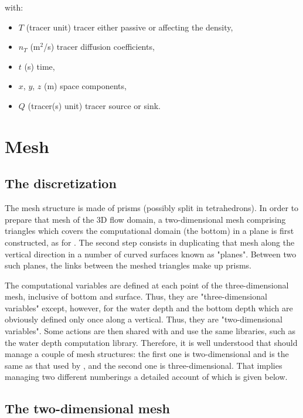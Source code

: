 with:

\begin{itemize}
\item $T$ (tracer unit) tracer either passive or affecting the density,

\item $n_{T}$  (m${}^{2}$/s) tracer diffusion coefficients,

\item $t$  (s) time,

\item $x$, $y$, $z$ (m) space components,

\item $Q$ (tracer(s) unit) tracer source or sink.
\end{itemize}


\section{Mesh}


\subsection{The discretization}

The  mesh structure is made of prisms (possibly split in
tetrahedrons). In order to prepare that mesh of the 3D flow domain, a
two-dimensional mesh comprising triangles which covers the computational domain
(the bottom) in a plane is first constructed, as for . The second
step consists in duplicating that mesh along the vertical direction in a number
of curved surfaces known as "planes". Between two such planes, the links
between the meshed triangles make up prisms.

The computational variables are defined at each point of the three-dimensional
mesh, inclusive of bottom and surface. Thus, they are "three-dimensional
variables" except, however, for the water depth and the bottom depth which are
obviously defined only once along a vertical. Thus, they are "two-dimensional
variables". Some  actions are then shared with  and use the
same libraries, such as the water depth computation library. Therefore, it is
well understood that  should manage a couple of mesh structures: the
first one is two-dimensional and is the same as that used by , and
the second one is three-dimensional. That implies managing two different
numberings a detailed account of which is given below.


\subsection{The two-dimensional mesh}
\label{sec:2dmesh}

